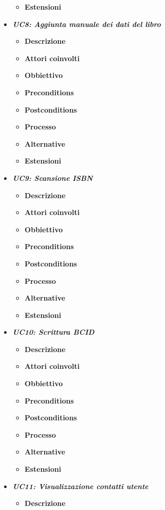 \begin{itemize}
\begin{itemize}
		\item \textbf{Estensioni}
	\end{itemize}
	\item \textbf{\textit{UC8: Aggiunta manuale dei dati del libro}}
	\begin{itemize}
		\item \textbf{Descrizione}
		\item \textbf{Attori coinvolti}
		\item \textbf{Obbiettivo}
		\item \textbf{Preconditions}
		\item \textbf{Postconditions}
		\item \textbf{Processo}
		\item \textbf{Alternative}
		\item \textbf{Estensioni}
	\end{itemize}
	\item \textbf{\textit{UC9: Scansione ISBN}}
	\begin{itemize}
		\item \textbf{Descrizione}
		\item \textbf{Attori coinvolti}
		\item \textbf{Obbiettivo}
		\item \textbf{Preconditions}
		\item \textbf{Postconditions}
		\item \textbf{Processo}
		\item \textbf{Alternative}
		\item \textbf{Estensioni}
	\end{itemize}
	\item \textbf{\textit{UC10: Scrittura BCID}}
	\begin{itemize}
		\item \textbf{Descrizione}
		\item \textbf{Attori coinvolti}
		\item \textbf{Obbiettivo}
		\item \textbf{Preconditions}
		\item \textbf{Postconditions}
		\item \textbf{Processo}
		\item \textbf{Alternative}
		\item \textbf{Estensioni}
	\end{itemize}
	\item \textbf{\textit{UC11: Visualizzazione contatti utente}}
	\begin{itemize}
		\item \textbf{Descrizione}

\end{itemize}
\end{itemize}
